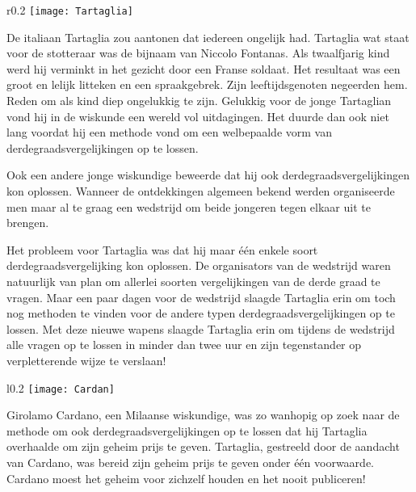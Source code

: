 \begin{wrapfigure}[9]{r}{0.2\textwidth}
  \vspace*{-0.5cm}
  \texttt{[image: Tartaglia]}
\end{wrapfigure}

De italiaan Tartaglia zou aantonen dat iedereen ongelijk had. Tartaglia wat staat voor de stotteraar was de bijnaam van Niccolo Fontanas. Als twaalfjarig kind werd hij verminkt in het gezicht door een Franse soldaat. Het resultaat was een groot en lelijk litteken en een spraakgebrek. Zijn leeftijdsgenoten negeerden hem. Reden om als kind diep ongelukkig te zijn. Gelukkig voor de jonge Tartaglian vond hij in de wiskunde een wereld vol uitdagingen. Het duurde dan ook niet lang voordat hij een methode vond om een welbepaalde vorm van derdegraadsvergelijkingen op te lossen.

Ook een andere jonge wiskundige beweerde dat hij ook derdegraadsvergelijkingen kon oplossen. Wanneer de ontdekkingen algemeen bekend werden organiseerde men maar al te graag een wedstrijd om beide jongeren tegen elkaar uit te brengen.

Het probleem voor Tartaglia was dat hij maar \'e\'en enkele soort derdegraadsvergelijking kon oplossen. De organisators van de wedstrijd waren natuurlijk van plan om allerlei soorten vergelijkingen van de derde graad te vragen. Maar een paar dagen voor de wedstrijd slaagde Tartaglia erin om toch nog methoden te vinden voor de andere typen derdegraadsvergelijkingen op te lossen. Met deze nieuwe wapens slaagde Tartaglia erin om tijdens de wedstrijd alle vragen op te lossen in minder dan twee uur en zijn tegenstander op verpletterende wijze te verslaan!

\begin{wrapfigure}[8]{l}{0.2\textwidth}
  \vspace*{-0.5cm}
  \texttt{[image: Cardan]}
\end{wrapfigure}

Girolamo Cardano, een Milaanse wiskundige, was zo wanhopig op zoek naar de methode om ook derdegraadsvergelijkingen op te lossen dat hij Tartaglia overhaalde om zijn geheim prijs te geven. Tartaglia, gestreeld door de aandacht van Cardano, was bereid zijn geheim prijs te geven onder \'e\'en voorwaarde. Cardano moest het geheim voor zichzelf houden en het nooit publiceren!

